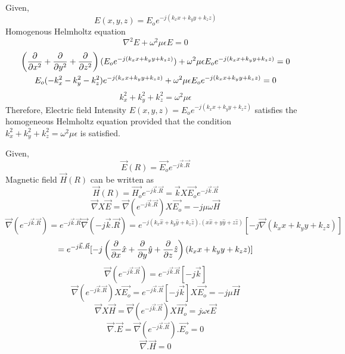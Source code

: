\documentclass[a4paper]{article}
\begin{document}
    \begin{answer}[Question 3]
        Given,
        \[
            {E}(x,y,z) = E_{o} e^{-j (k_{x} x+k_{y} y+k_{z} z)}
        \]
        Homogenous Helmholtz equation 
        \begin{equation}
            \boxed{\nabla^2 {E} + \omega^2 \mu \epsilon {E} = 0}
        \end{equation}
        \begin{gather*}
            \left(\pdv{}{x^2}+\pdv{}{y^2}+\pdv{}{z^2}\right)(E_o e^{-j (k_{x} x+k_{y} y+k_{z} z)}) + \omega^2 \mu \epsilon {E_o}e^{-j (k_{x} x+k_{y} y+k_{z} z)} = 0\\
            E_o(-k_{x}^2 -k_{y} ^2 -k_{z} ^2 )e^{-j (k_{x} x+k_{y} y+k_{z} z)} + \omega^2 \mu \epsilon {E_o}e^{-j (k_{x} x+k_{y} y+k_{z} z)} = 0\\ 
        \end{gather*}
        \begin{equation}
            \boxed{k_{x} ^2 + k_{y} ^2 + k_{z} ^2 = \omega ^2 \mu \epsilon }
        \end{equation}
        Therefore, Electric field Intensity \({E}(x,y,z) = E_{o} e^{-j (k_{x} x+k_{y} y+k_{z} z)}\)  satisfies the homogeneous Helmholtz equation provided that the condition \(k_{x} ^2 + k_{y} ^2 + k_{z} ^2 = \omega ^2 \mu \epsilon\) is satisfied. 
    \end{answer}
    \begin{answer}[Question 4]
        Given,
        \[
            \vec{E}(R) = \vec{E_{o}} e^{-j \vec{k}.\vec{R}}
        \]
        Magnetic field \(\vec{H}(R)\) can be written as
        \[
            \vec{H}(R) = \vec{H_{o}} e^{-j \vec{k}.\vec{R}} = \vec{k}X\vec{E_{o} }e^{-j \vec{k}.\vec{R}}
        \]
    \begin{equation}
            \boxed{\vec{\nabla}X\vec{E} = \vec{\nabla}(e^{-j \vec{k}.\vec{R}})X\vec{E_{o}} = -j \mu \omega \vec{H}}
    \end{equation}
        \[
            \vec{\nabla}(e^{-j \vec{k}.\vec{R}}) = e^{-j \vec{k}.\vec{R}} \vec{\nabla}(-j \vec{k}.\vec{R}) = e^{-j (k_{x} \hat{x}  + k_{y} \hat{y}  + k_{z} \hat{z} ).(x \hat{x} + y \hat{y} + z \hat{z} )}[-j \vec{\nabla}(k_{x} x + k_{y} y + k_{z} z)]
        \]
        \[
            =  e^{-j \vec{k}.\vec{R}}[-j \left(\pdv{}{x}\hat{x} + \pdv{}{y} \hat{y} + \pdv{}{z} \hat{z} \right)(k_{x} x + k_{y} y + k_{z} z)] 
        \]
        \begin{equation}
            \vec{\nabla}(e^{-j \vec{k}.\vec{R}}) = e^{-j \vec{k}.\vec{R}}[-j \vec{k}] 
        \end{equation}
        \[
            \vec{\nabla}(e^{-j \vec{k}.\vec{R}})X\vec{E_o}  = e^{-j \vec{k}.\vec{R}}[-j \vec{k}]X\vec{E_o} = -j \mu \vec{H} 
        \]
        \[
            \vec{\nabla}X\vec{H} = \vec{\nabla}(e^{-j \vec{k}.\vec{R}})X\vec{H_o} = j \omega \epsilon \vec{E}
        \]
        \[
            \vec{\nabla}.\vec{E} = \vec{\nabla}(e^{-j \vec{k}.\vec{R}}).\vec{E_o} = 0
        \]
        \[
            \vec{\nabla}.\vec{H} = 0
        \]
    \end{answer}
\end{document}
